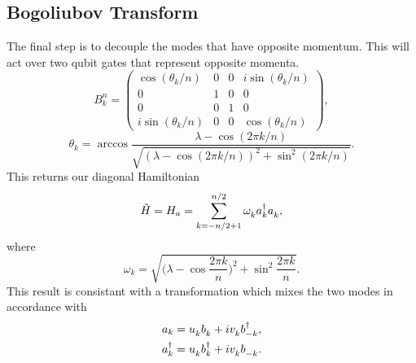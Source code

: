 \documentclass[12pt]{article}
\newcommand*{\iu}{i}
\begin{document}
  \subsection{Bogoliubov Transform}
  The final step is to decouple the modes that have opposite momentum. This will act over two qubit gates that represent opposite momenta.
  \begin{equation}
    B_{k}^{n}
      = \begin{pmatrix}
              \cos(\theta_{k} / n) & 0 & 0 & \iu \sin(\theta_{k} / n) \\
                                 0 & 1 & 0 &                        0 \\
                                 0 & 0 & 1 &                        0 \\
          \iu \sin(\theta_{k} / n) & 0 & 0 &     \cos(\theta_{k} / n)
      \end{pmatrix},
  \end{equation}
  \begin{equation}
    \theta_{k}
      = \arccos
        \frac{\lambda - \cos(2 \pi k / n)}
             {\sqrt{(\lambda - \cos(2 \pi k / n))^{2} + \sin^{2}(2 \pi k / n)}}.
  \end{equation}
  This returns our diagonal Hamiltonian
    \begin{equation}
      \tilde{H}
        = H_{a}
        = \sum_{k = -n / 2 + 1}^{n / 2}
          \omega_{k}^{\vphantom{\dagger}} a_{k}^{\dagger}
          a_{k}^{\vphantom{\dagger}},
    \end{equation}
    where
    \begin{equation}
      \omega_{k}
        = \sqrt{\biggl( \lambda - \cos \frac{2\pi k}{n} \biggr)^{2}
                + \sin^{2} \frac{2\pi k}{n}}.
    \end{equation}
    This result is consistant with a transformation which mixes the two modes in accordance with
    \begin{subequations}
      \begin{align}
        a_{k}
          &= u_{k}^{\vphantom{\dagger}} b_{k}^{\vphantom{\dagger}}
             + \iu v_{k}^{\vphantom{\dagger}} b_{-k}^{\dagger}, \\
        a_{k}^{\dagger}
          &= u_{k}^{\vphantom{\dagger}} b_{k}^{\dagger}
             + \iu v_{k}^{\vphantom{\dagger}} b_{-k}^{\vphantom{\dagger}}.
      \end{align}
    \end{subequations}
\end{document}
